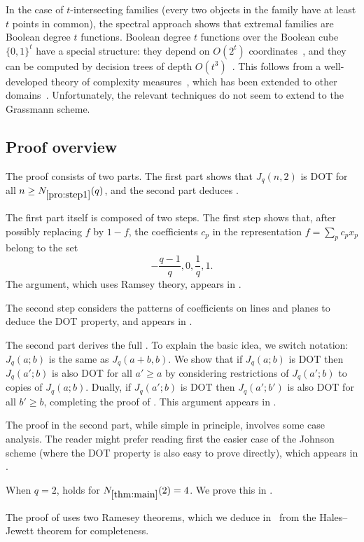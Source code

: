 \documentclass{article}
\theoremstyle{definition}
\providecommand{\Nmain}{N_{\ref{thm:main}}}
\providecommand{\Nlist}{N_{\ref{pro:step1}}}
\begin{document}
In the case of $t$-intersecting families (every two objects in the family have at least $t$ points in common), the spectral approach shows that extremal families are Boolean degree $t$ functions. Boolean degree $t$ functions over the Boolean cube $\{0,1\}^t$ have a special structure: they depend on $O(2^t)$ coordinates~\cite{CHS20,Wellens22}, and they can be computed by decision trees of depth $O(t^3)$~\cite{Mid04}. This follows from a well-developed theory of complexity measures~\cite{BdW02}, which has been extended to other domains~\cite{DFLLV21}. Unfortunately, the relevant techniques do not seem to extend to the Grassmann scheme.

\subsection{Proof overview}
\label{sec:proof-overview}

The proof consists of two parts. The first part shows that $J_q(n,2)$ is DOT for all $n \ge \Nlist(q)$, and the second part deduces .

The first part itself is composed of two steps. The first step shows that, after possibly replacing $f$ by $1-f$, the coefficients $c_p$ in the representation $f = \sum_p c_p x_p$ belong to the set
\[
 -\frac{q-1}{q}, 0, \frac{1}{q}, 1.
\]
The argument, which uses Ramsey theory, appears in .

The second step considers the patterns of coefficients on lines and planes to deduce the DOT property, and appears in .

The second part derives the full . To explain the basic idea, we switch notation: $J_q(a;b)$ is the same as $J_q(a+b,b)$. We show that if $J_q(a;b)$ is DOT then $J_q(a';b)$ is also DOT for all $a' \ge a$ by considering restrictions of $J_q(a';b)$ to copies of $J_q(a;b)$. Dually, if $J_q(a';b)$ is DOT then $J_q(a';b')$ is also DOT for all $b' \ge b$, completing the proof of . This argument appears in .

The proof in the second part, while simple in principle, involves some case analysis. The reader might prefer reading first the easier case of the Johnson scheme (where the DOT property is also easy to prove directly), which appears in .

When $q = 2$,  holds for $\Nmain(2) = 4$. We prove this in .

The proof of  uses two Ramesey theorems, which we deduce in~ from the Hales--Jewett theorem for completeness.
\end{document}
